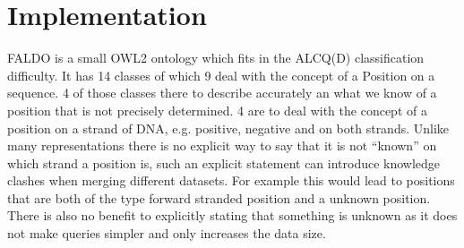 \section*{Implementation}

FALDO is a small OWL2 ontology which fits in the ALCQ(D) classification difficulty.
It has 14 classes of which 9 deal with the concept of a Position on a sequence. 
4 of those classes there to describe accurately an what we know of a position that is not precisely determined. 
4 are to deal with the concept of a position on a strand of DNA, e.g. positive, negative and on both strands.
Unlike many representations there is no explicit way to say that it is not ``known'' on which strand a position is,
such an explicit statement can introduce knowledge clashes when merging different datasets.
For example this would lead to positions that are both of the type forward stranded position and a unknown position.
There is also no benefit to explicitly stating that something is unknown as it does not make queries simpler and 
only increases the data size.

